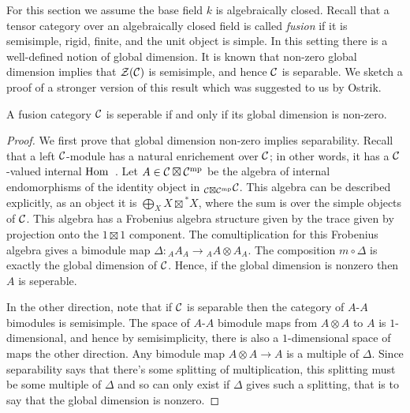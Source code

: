 \documentclass{amsart}
\begin{document}
For this section we assume the base field $k$ is algebraically closed.  Recall that a tensor category over an algebraically closed field is called \emph{fusion} if it is semisimple, rigid, finite, and the unit object is simple.  In this setting there is a well-defined notion of global dimension.    It is known \cite{???} that non-zero global dimension implies that $\mathcal Z(\mathcal C)$ is semisimple, and hence $\mathcal C$ is separable.  We sketch a proof of a stronger version of this result which was suggested to us by Ostrik.

\begin{theorem} \label{thm:NonzeroDimension}
A fusion category $\mathcal C$ is seperable if and only if its global dimension is non-zero.
\end{theorem}
\begin{proof}
We first prove that global dimension non-zero implies separability.  Recall that a left $\mathcal C$-module has a natural enrichement over $\mathcal C$; in other words, it has a $\mathcal C$-valued internal $\operatorname{Hom}$~\cite{Ostrik03}.  Let $A \in \mathcal C \boxtimes \mathcal C^{\mathrm{mp}}$ be the algebra of internal endomorphisms of the identity object in ${}_{\mathcal C \boxtimes \mathcal C^{\mathrm{mp}}} \mathcal C$.  This algebra can be described explicitly, as an object it is $\bigoplus_X X \boxtimes {}^*X$, where the sum is over the simple objects of $\mathcal C$.  This algebra has a Frobenius algebra structure given by the trace given by projection onto the $1 \boxtimes 1$ component.  The comultiplication for this Frobenius algebra gives a bimodule map $\Delta: {}_A A_A \rightarrow {}_A A \otimes A_A$.  The composition $m \circ \Delta$ is exactly the global dimension of $\mathcal C$.  Hence, if the global dimension is nonzero then $A$ is seperable.


In the other direction, note that if $\mathcal C$ is separable then the category of $A$-$A$ bimodules is semisimple.  The space of $A$-$A$ bimodule maps from $A \otimes A$ to $A$  is $1$-dimensional, and hence by semisimplicity, there is also a $1$-dimensional space of maps the other direction.  Any bimodule map $A \otimes A \rightarrow A$ is a multiple of $\Delta$.  Since separability says that there's some splitting of multiplication, this splitting must be some multiple of $\Delta$ and so can only exist if $\Delta$ gives such a splitting, that is to say that the global dimension is nonzero.
\end{proof}
\end{document}
